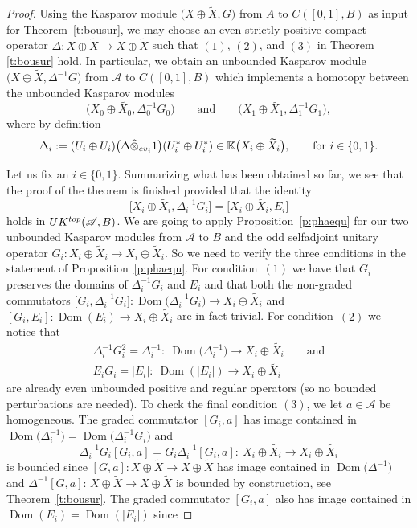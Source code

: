 \documentclass[11pt]{article}
\numberwithin{equation}{section}
\newcommand{\hot}{\widehat \otimes}
\newcommand{\op}{\oplus}
\newcommand{\De}{\Delta}
\newcommand{\s}[1]{\mathscr{#1}}
\newcommand{\B}[1]{\mathbb{#1}}
\newcommand{\wit}{\widetilde}
\begin{document}
\begin{proof}
Using the Kasparov module $\big(X \op \wit X, G\big)$ from $A$ to $C([0,1],B)$ as input for Theorem~\ref{t:bousur}, we may choose an even strictly positive compact operator $\De\colon X \op \wit X \to X \op \wit X$ such that $(1)$, $(2)$, and $(3)$ in Theorem \ref{t:bousur} hold. In particular, we obtain an unbounded Kasparov module $\big( X \op \wit X, \De^{-1}G\big)$ from $\s A$ to $C([0,1],B)$ which implements a homotopy between the unbounded Kasparov modules
\[
\big(X_0 \op \wit{X_0}, \De_0^{-1} G_0\big) \qquad \text{and} \qquad \big(X_1 \op \wit{X_1}, \De_1^{-1} G_1\big) ,
\]
where by definition
\[
\De_i := (U_i \op U_i) \big(\De \hot_{{\rm ev}_i} 1 \big) (U_i^* \op U_i^*) \in \B K\big( X_i \op \wit X_i\big) , \qquad \text{for } i \in \{0,1\} .
\]

Let us fix an $i \in \{0,1\}$. Summarizing what has been obtained so far, we see that the proof of the theorem is finished provided that the identity
\[
\big[X_i \op \wit{X_i}, \De_i^{-1} G_i\big] = \big[ X_i \op \wit{X_i}, E_i\big]
\]
holds in $UK^{{\rm top}}(\s A,B)$. We are going to apply Proposition~\ref{p:phaequ} for our two unbounded Kasparov modules from $\s A$ to $B$ and the odd selfadjoint unitary operator $G_i\colon X_i \op \wit X_i \to X_i \op \wit X_i$. So we need to verify the three conditions in the statement of Proposition~\ref{p:phaequ}. For condition~$(1)$ we have that $G_i$ preserves the domains of $\De_i^{-1} G_i$ and $E_i$ and that both the non-graded commutators $\big[G_i, \De_i^{-1} G_i\big]\colon \operatorname{Dom}\big(\De_i^{-1} G_i\big) \to X_i \op \wit{X_i}$ and $[G_i, E_i]\colon \operatorname{Dom}(E_i) \to X_i \op \wit{X_i}$ are in fact trivial. For condition~$(2)$ we notice that
\begin{gather*}
 \De_i^{-1} G_i^2 = \De_i^{-1}\colon \ \operatorname{Dom}\big(\De_i^{-1}\big) \to X_i \op \wit{X_i} \qquad \text{and} \\
 E_i G_i = |E_i|\colon \ \operatorname{Dom}(|E_i|) \to X_i \op \wit{X_i}
\end{gather*}
are already even unbounded positive and regular operators (so no bounded perturbations are needed). To check the final condition $(3)$, we let $a \in \s A$ be homogeneous. The graded commutator $[G_i,a]$ has image contained in $\operatorname{Dom}\big(\De_i^{-1}\big) = \operatorname{Dom}\big(\De_i^{-1} G_i\big)$ and
\[
\De_i^{-1} G_i [G_i,a] = G_i \De_i^{-1} [G_i,a]\colon\ X_i \op \wit{X_i} \to X_i \op \wit{X_i}
\]
is bounded since $[G,a]\colon X \op \wit X \to X \op \wit X$ has image contained in $\operatorname{Dom}\big(\De^{-1}\big)$ and $\De^{-1} [G,a]$: $X \op \wit X \to X \op \wit X$ is bounded by construction, see Theorem~\ref{t:bousur}. The graded commutator $[G_i,a]$ also has image contained in $\operatorname{Dom}(E_i) = \operatorname{Dom}(|E_i|)$ since

\end{proof}
\end{document}
